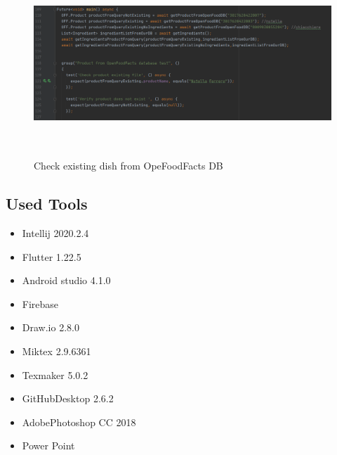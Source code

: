 \documentclass [12pt]{article}
\begin{document}
\begin{itemize}[•]
\begin{figure}[h!]
\medskip
\small
\end{figure}
\begin{figure}[h!]
\centering
\includegraphics[width=\linewidth,height=7cm]{existingTestDishFromOpenFoodFacts.PNG}
\caption{Check existing dish from OpeFoodFacts DB}
\medskip
\small
\end{figure}

\end{itemize}
\clearpage
\subsection{Used Tools}
\begin{itemize}
\item Intellij 2020.2.4
\item Flutter 1.22.5
\item Android studio 4.1.0
\item Firebase
\item Draw.io 2.8.0
\item Miktex 2.9.6361
\item Texmaker 5.0.2
\item GitHubDesktop 2.6.2
\item AdobePhotoshop CC 2018
\item Power Point

\end{itemize}
\end{document}
